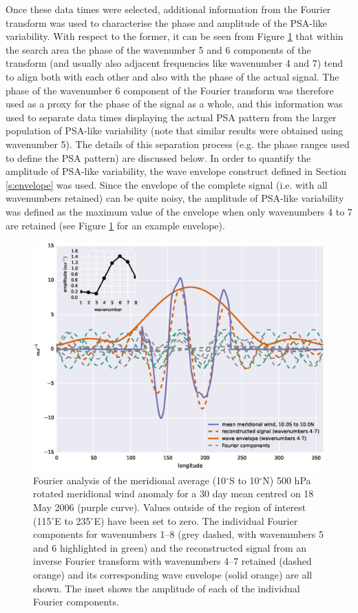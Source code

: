 Once these data times were selected, additional information from the Fourier transform was used to characterise the phase and amplitude of the PSA-like variability. With respect to the former, it can be seen from Figure \ref{fig:transform} that within the search area the phase of the wavenumber 5 and 6 components of the transform (and usually also adjacent frequencies like wavenumber 4 and 7) tend to align both with each other and also with the phase of the actual signal. The phase of the wavenumber 6 component of the Fourier transform was therefore used as a proxy for the phase of the signal as a whole, and this information was used to separate data times displaying the actual PSA pattern from the larger population of PSA-like variability (note that similar results were obtained using wavenumber 5). The details of this separation process (e.g. the phase ranges used to define the PSA pattern) are discussed below. In order to quantify the amplitude of PSA-like variability, the wave envelope construct defined in Section \ref{s:envelope} was used. Since the envelope of the complete signal (i.e. with all wavenumbers retained) can be quite noisy, the amplitude of PSA-like variability was defined as the maximum value of the envelope when only wavenumbers 4 to 7 are retained (see Figure \ref{fig:transform} for an example envelope).

\begin{figure}
\begin{center}
\includegraphics[width=0.84\columnwidth]{figures/psa/psa_check_2006-05-18_10S-10N_hilbert.eps}
\caption[Fourier analysis of the meridional average (10$^{\circ}$S to 10$^{\circ}$N) 500 hPa rotated meridional wind anomaly for a 30 day mean centred on 18 May 2006]{\label{fig:transform}
Fourier analysis of the meridional average (10$^{\circ}$S to 10$^{\circ}$N) 500 hPa rotated meridional wind anomaly for a 30 day mean centred on 18 May 2006 (purple curve). Values outside of the region of interest (115$^{\circ}$E to 235$^{\circ}$E) have been set to zero. The individual Fourier components for wavenumbers 1--8 (grey dashed, with wavenumbers 5 and 6 highlighted in green) and the reconstructed signal from an inverse Fourier transform with wavenumbers 4--7 retained (dashed orange) and its corresponding wave envelope (solid orange) are all shown. The inset shows the amplitude of each of the individual Fourier components.
}
\end{center}
\end{figure}

